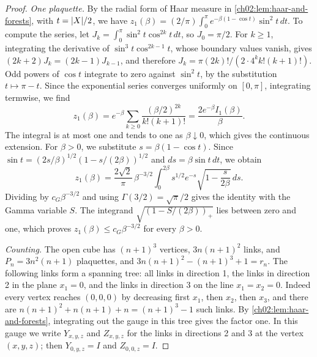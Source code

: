 \begin{proof}
\emph{One plaquette.} By the radial form of Haar measure in \cref{ch02:lem:haar-and-forests}, with $t=\lvert X\rvert/2$, we have $z_1(\beta)=(2/\pi)\int_0^\pi e^{-\beta(1-\cos t)}\sin^2t\,dt$. To compute the series, let $J_k=\int_0^\pi\sin^2t\cos^{2k}t\,dt$, so $J_0=\pi/2$. For $k\ge1$, integrating the derivative of $\sin^3t\cos^{2k-1}t$, whose boundary values vanish, gives $(2k+2)J_k=(2k-1)J_{k-1}$, and therefore $J_k=\pi(2k)!/(2\cdot4^kk!(k+1)!)$. Odd powers of $\cos t$ integrate to zero against $\sin^2t$, by the substitution $t\mapsto\pi-t$. Since the exponential series converges uniformly on $[0,\pi]$, integrating termwise, we find
\[
 z_1(\beta)=e^{-\beta}\sum_{k\ge0}\frac{(\beta/2)^{2k}}{k!(k+1)!}=\frac{2e^{-\beta}I_1(\beta)}\beta.
\]
The integral is at most one and tends to one as $\beta\downarrow0$, which gives the continuous extension. For $\beta>0$, we substitute $s=\beta(1-\cos t)$. Since $\sin t=(2s/\beta)^{1/2}(1-s/(2\beta))^{1/2}$ and $ds=\beta\sin t\,dt$, we obtain
\begin{equation}\label{ch03:eq:gamma-one-face}
 z_1(\beta)=\frac{2\sqrt2}\pi\,\beta^{-3/2}\int_0^{2\beta}s^{1/2}e^{-s}\sqrt{1-\frac s{2\beta}}\,ds.
\end{equation}
Dividing by $c_G\beta^{-3/2}$ and using $\Gamma(3/2)=\sqrt\pi/2$ gives the identity with the Gamma variable $S$. The integrand $\sqrt{(1-S/(2\beta))_+}$ lies between zero and one, which proves $z_1(\beta)\le c_G\beta^{-3/2}$ for every $\beta>0$.

\emph{Counting.} The open cube has $(n+1)^3$ vertices, $3n(n+1)^2$ links, and $P_n=3n^2(n+1)$ plaquettes, and $3n(n+1)^2-(n+1)^3+1=r_n$. The following links form a spanning tree: all links in direction 1, the links in direction 2 in the plane $x_1=0$, and the links in direction 3 on the line $x_1=x_2=0$. Indeed every vertex reaches $(0,0,0)$ by decreasing first $x_1$, then $x_2$, then $x_3$, and there are $n(n+1)^2+n(n+1)+n=(n+1)^3-1$ such links. By \cref{ch02:lem:haar-and-forests}, integrating out the gauge in this tree gives the factor one. In this gauge we write $Y_{x,y,z}$ and $Z_{x,y,z}$ for the links in directions 2 and 3 at the vertex $(x,y,z)$; then $Y_{0,y,z}=I$ and $Z_{0,0,z}=I$.


\end{proof}
